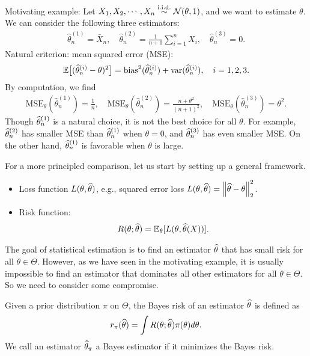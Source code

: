 \documentclass[11pt,letterpaper]{article}
\numberwithin{assumption}{lecture}
\numberwithin{theorem}{lecture}
\numberwithin{proposition}{lecture}
\numberwithin{lemma}{lecture}
\numberwithin{claim}{lecture}
\numberwithin{corollary}{lecture}
\numberwithin{definition}{lecture}
\numberwithin{conjecture}{lecture}
\numberwithin{remark}{lecture}
\numberwithin{example}{lecture}
\numberwithin{equation}{lecture}
\begin{document}
Motivating example: Let $X_1, X_2, \cdots, X_n \overset{\mathrm{i.i.d.}}{\sim} \mathcal{N} (\theta, 1)$, and we want to estimate $\theta$. We can consider the following three estimators:
\begin{align*}
  \widehat{\theta}^{(1)}_n = \bar{X}_n, \quad \widehat{\theta}^{(2)}_n = \frac{1}{n + 1} \sum_{i=1}^n X_i,\quad \widehat{\theta}^{(3)}_n = 0.
\end{align*}
Natural criterion: mean squared error (MSE):
\begin{align*}
  {\mathbb{E}} \big[ (\widehat{\theta}^{(i)}_n - \theta)^2 \big] = \mathrm{bias}^2 (\widehat{\theta}^{(i)}_n) + \mathrm{var} (\widehat{\theta}^{(i)}_n), \quad i = 1, 2, 3.
\end{align*}
By computation, we find
\begin{align*}
  \mathrm{MSE}_\theta (\widehat{\theta}^{(1)}_n) = \frac{1}{n}, \quad \mathrm{MSE}_\theta (\widehat{\theta}^{(2)}_n) = \frac{n + \theta^2}{(n + 1)^2}, \quad \mathrm{MSE}_\theta (\widehat{\theta}^{(3)}_n) = \theta^2.
\end{align*}
Though $\widehat{\theta}^{(1)}_n$ is a natural choice, it is not the best choice for all $\theta$. For example, $\widehat{\theta}^{(2)}_n$ has smaller MSE than $\widehat{\theta}^{(1)}_n$ when $\theta = 0$, and $\widehat{\theta}^{(3)}_n$ has even smaller MSE. On the other hand, $\widehat{\theta}^{(1)}_n$ is favorable when $\theta$ is large.

\bigskip

For a more principled comparison, let us start by setting up a general framework.
\begin{itemize}
  \item Loss function $L (\theta, \widehat{\theta})$, e.g., squared error loss $L (\theta, \widehat{\theta}) = \left\| \widehat{\theta} - \theta\right\|_{2}^2$.
  \item Risk function:
  \begin{align*}
    R (\theta; \widehat{\theta}) = {\mathbb{E}}_\theta [L (\theta, \widehat{\theta}(X))].
  \end{align*}
\end{itemize}
The goal of statistical estimation is to find an estimator $\widehat{\theta}$ that has small risk for all $\theta \in \Theta$. However, as we have seen in the motivating example, it is usually impossible to find an estimator that dominates all other estimators for all $\theta \in \Theta$. So we need to consider some compromise.

\begin{definition}
  Given a prior distribution $\pi$ on $\Theta$, the Bayes risk of an estimator $\widehat{\theta}$ is defined as
  \begin{align*}
    r_\pi (\widehat{\theta}) = \int R(\theta; \widehat{\theta}) \pi (\theta) d\theta.
  \end{align*}
  We call an estimator $\widehat{\theta}_\pi$ a Bayes estimator if it minimizes the Bayes risk.
\end{definition}
\end{document}
